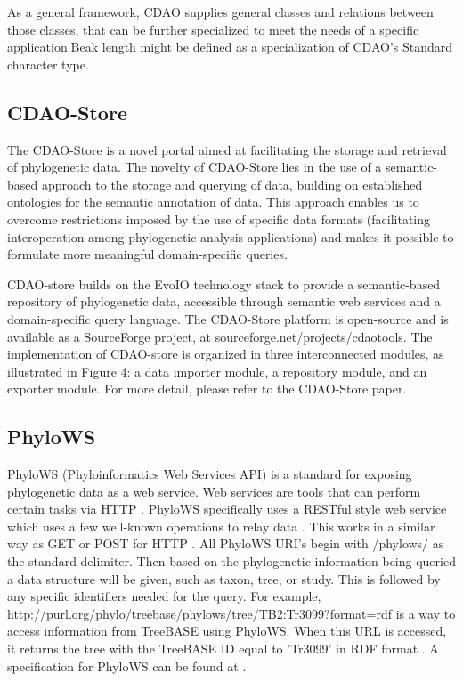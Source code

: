 \documentclass[10pt]{article}
\begin{document}
As a general framework, CDAO supplies general classes and relations between
those classes, that can be further specialized to meet the needs of a specific
application|Beak length might be defined as a specialization of CDAO's Standard
character type.

\subsection{CDAO-Store}
The CDAO-Store is a novel portal aimed at facilitating the storage and
retrieval of phylogenetic data. The novelty of CDAO-Store lies in the use of a
semantic-based approach to the storage and querying of data, building on
established ontologies for the semantic annotation of data. This approach
enables us to overcome restrictions imposed by the use of specific data formats
(facilitating interoperation among phylogenetic analysis applications) and
makes it possible to formulate more meaningful domain-specific queries.

CDAO-store builds on the EvoIO technology stack to provide a semantic-based
repository of phylogenetic data, accessible through semantic web services and a
domain-specific query language. The CDAO-Store platform is open-source and is
available as a SourceForge project, at sourceforge.net/projects/cdaotools.  The
implementation of CDAO-store is organized in three interconnected modules, as
illustrated in Figure 4: a data importer module, a repository module, and an
exporter module.  For more detail, please refer to the CDAO-Store paper.

\subsection{PhyloWS}
PhyloWS (Phyloinformatics Web Services API) is a standard for exposing
phylogenetic data as a web service. Web services are tools that can perform
certain tasks via HTTP \cite{WebService}. PhyloWS specifically uses a RESTful
style web service which uses a few well-known operations to relay data
\cite{PhyloWSWiki}  \cite{Fielding02principleddesign}. This works in a similar
way as GET or POST for HTTP \cite{Fielding02principleddesign}.  All PhyloWS
URI's begin with /phylows/ as the standard delimiter. Then based on the
phylogenetic information being queried a data structure will be given, such as
taxon, tree, or study.  This is followed by any specific identifiers needed for
the query.
For example, http://purl.org/phylo/treebase/phylows/tree/TB2:Tr3099?format=rdf
is a way to access information from TreeBASE using PhyloWS. When this URL is
accessed, it returns the tree with the TreeBASE ID equal to 'Tr3099' in RDF
format \cite{treebasePhyloWS}. A specification for PhyloWS can be found at \cite{PhyloWSWiki}.
\end{document}
